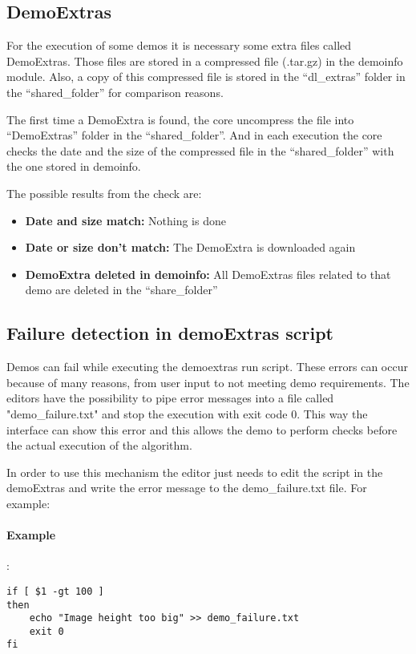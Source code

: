 \subsection{DemoExtras}

For the execution of some demos it is necessary some extra files called DemoExtras. Those files are stored in a compressed file (.tar.gz) in the demoinfo module. Also, a copy of this compressed file is stored in the ``dl\_extras'' folder in the ``shared\_folder'' for comparison reasons.

The first time a DemoExtra is found, the core uncompress the file into ``DemoExtras'' folder in the ``shared\_folder''. And in each execution the core checks the date and the size of the compressed file in the ``shared\_folder'' with the one stored in demoinfo.

The possible results from the check are:
\begin{itemize}
 \item \textbf{Date and size match:} Nothing is done
 \item \textbf{Date or size don't match:} The DemoExtra is downloaded again
 \item \textbf{DemoExtra deleted in demoinfo:} All DemoExtras files related to that demo are deleted in the ``share\_folder''
\end{itemize}

\subsection{Failure detection in demoExtras script}

Demos can fail while executing the demoextras run script. These errors can occur because of many reasons, from user input to not meeting demo 
requirements. The editors have the possibility to pipe error messages into a file called "demo\_failure.txt" and stop the execution with exit
code 0. This way the interface can show this error and this allows the demo to perform checks before the actual execution of the algorithm.

In order to use this mechanism the editor just needs to edit the script in the demoExtras and write the error message to the demo\_failure.txt file. 
For example:
\paragraph{Example}:\\
\begin{verbatim}
if [ $1 -gt 100 ]
then
    echo "Image height too big" >> demo_failure.txt
    exit 0
fi
\end{verbatim} 
